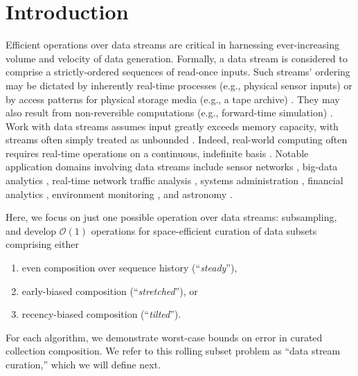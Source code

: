 \section{Introduction} \label{sec:introduction}

Efficient operations over data streams are critical in harnessing ever-increasing volume and velocity of data generation.
Formally, a data stream is considered to comprise a strictly-ordered sequences of read-once inputs.
Such streams' ordering may be dictated by inherently real-time processes (e.g., physical sensor inputs) or by access patterns for physical storage media (e.g., a tape archive) \citep{henzinger1998computing}.
They may also result from non-reversible computations (e.g., forward-time simulation) \citep{abdulla2004simulation,schutzel2014stream}.
Work with data streams assumes input greatly exceeds memory capacity, with streams often simply treated as unbounded \citep{jiang2006research}.
Indeed, real-world computing often requires real-time operations on a continuous, indefinite basis \citep{cordeiro2016online}.
Notable application domains involving data streams include sensor networks \citep{elnahrawy2003research}, big-data analytics \citep{he2010comet}, real-time network traffic analysis \citep{johnson2005streams,muthukrishnan2005data}, systems administration \citep{fischer2012real}, financial analytics \citep{rajeshwari2016real,agarwal2009faster}, environment monitoring \citep{hill2009real}, and astronomy \citep{graham2012data}.

Here, we focus on just one possible operation over data streams: subsampling, and develop $\mathcal{O}(1)$ operations for space-efficient curation of data subsets comprising either
\begin{enumerate}
\item even composition over sequence history (``\textit{steady}''),
\item early-biased composition (``\textit{stretched}''), or
\item recency-biased composition (``\textit{tilted}'').
\end{enumerate}
For each algorithm, we demonstrate worst-case bounds on error in curated collection composition.
We refer to this rolling subset problem as ``data stream curation,'' which we will define next.






